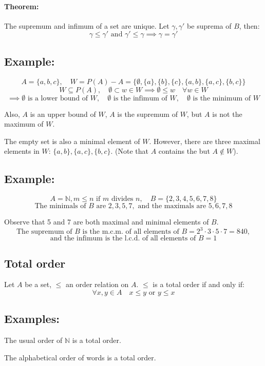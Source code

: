 \documentclass[11pt]{article}
\begin{document}
\paragraph{Theorem: } The supremum and infimum of a set are unique.
Let $\gamma, \gamma'$ be suprema of $B$, then:
\[
\gamma \leq \gamma' \text{ and } \gamma' \leq \gamma \implies \gamma = \gamma'
\]

\subsection*{Example:}
\[
A = \{a,b,c\}, \quad W = P(A) - A = \{\emptyset, \{a\}, \{b\}, \{c\}, \{a,b\}, \{a,c\}, \{b,c\}\}
\]
\[
W \subseteq P(A), \quad \emptyset \subset w \in W \implies \emptyset \leq w \quad \forall w \in W
\]
\[
\implies \emptyset \text{ is a lower bound of } W, \quad \emptyset \text{ is the infimum of } W, \quad \emptyset \text{ is the minimum of } W
\]

Also, $A$ is an upper bound of $W$, $A$ is the supremum of $W$, but $A$ is not the maximum of $W$.

The empty set is also a minimal element of $W$. However, there are three maximal elements in $W$: $\{a,b\}, \{a,c\}, \{b,c\}$. (Note that $A$ contains the but $A \notin W$).

\subsection*{Example:}
\[
A = \mathbb{N}, m \leq n \text{ if } m \text{ divides } n, \quad B = \{2,3,4,5,6,7,8\}
\]
\[
\text{The minimals of $B$ are } 2, 3, 5, 7, \text{ and the maximals are } 5,6,7,8
\]

Observe that 5 and 7 are both maximal and minimal elements of $B$.
\[
\text{The supremum of $B$ is the m.c.m. of all elements of $B$} = 2^3 \cdot 3 \cdot 5 \cdot 7 = 840, 
\]
\[
\text{and the infimum is the l.c.d. of all elements of $B$} = 1
\]

\subsection{Total order}
Let $A$ be a set, $\leq$ an order relation on $A$. $\leq$ is a total order if and only if:
\[
\forall x, y \in A \quad x \leq y \text{ or } y \leq x
\]

\subsection*{Examples:}
The usual order of $\mathbb{N}$ is a total order.

The alphabetical order of words is a total order.
\end{document}

